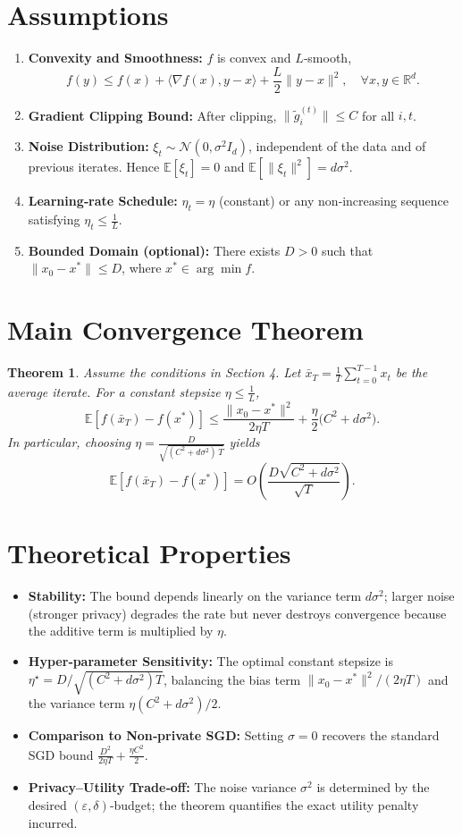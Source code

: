 \documentclass{article}
\newtheorem{theorem}{Theorem}
\newcommand{\EE}{\mathbb{E}}
\newcommand{\RR}{\mathbb{R}}
\begin{document}
\newpage
\section*{Assumptions}
\begin{enumerate}
\item \textbf{Convexity and Smoothness:} $f$ is convex and $L$‑smooth,
\[
f(y)\le f(x)+\langle\nabla f(x),y-x\rangle+\frac{L}{2}\|y-x\|^{2},
\quad\forall x,y\in\RR^{d}.
\]
\item \textbf{Gradient Clipping Bound:} After clipping, $\|\tilde g_i^{(t)}\|\le C$
for all $i,t$.
\item \textbf{Noise Distribution:} $\xi_t\sim\mathcal N(0,\sigma^{2}I_d)$, independent
of the data and of previous iterates. Hence $\EE[\xi_t]=0$ and
$\EE[\|\xi_t\|^{2}]=d\sigma^{2}$.
\item \textbf{Learning‑rate Schedule:} $\eta_t=\eta$ (constant) or any
non‑increasing sequence satisfying $\eta_t\le \frac{1}{L}$.
\item \textbf{Bounded Domain (optional):} There exists $D>0$ such that
$\|x_0-x^{*}\|\le D$, where $x^{*}\in\arg\min f$.
\end{enumerate}

\section*{Main Convergence Theorem}
\begin{theorem}
\label{thm:conv}
Assume the conditions in Section 4. Let $\bar x_T=\frac{1}{T}\sum_{t=0}^{T-1}x_t$
be the average iterate. For a constant stepsize $\eta\le \frac{1}{L}$,
\[
\EE\!\left[f(\bar x_T)-f(x^{*})\right]
\le
\frac{\|x_0-x^{*}\|^{2}}{2\eta T}
+\frac{\eta}{2}\bigl(C^{2}+d\sigma^{2}\bigr).
\]
In particular, choosing $\eta=\frac{D}{\sqrt{(C^{2}+d\sigma^{2})\,T}}$ yields
\[
\EE\!\left[f(\bar x_T)-f(x^{*})\right]
=O\!\left(\frac{D\sqrt{C^{2}+d\sigma^{2}}}{\sqrt{T}}\right).
\]
\end{theorem}

\section*{Theoretical Properties}
\begin{itemize}
\item \textbf{Stability:} The bound depends linearly on the variance term
$d\sigma^{2}$; larger noise (stronger privacy) degrades the rate but never
destroys convergence because the additive term is multiplied by $\eta$.
\item \textbf{Hyper‑parameter Sensitivity:} The optimal constant stepsize is
$\eta^{\star}=D/\sqrt{(C^{2}+d\sigma^{2})T}$, balancing the bias term
$\|x_0-x^{*}\|^{2}/(2\eta T)$ and the variance term $\eta(C^{2}+d\sigma^{2})/2$.
\item \textbf{Comparison to Non‑private SGD:} Setting $\sigma=0$ recovers the
standard SGD bound $\frac{D^{2}}{2\eta T}+\frac{\eta C^{2}}{2}$.
\item \textbf{Privacy–Utility Trade‑off:} The noise variance $\sigma^{2}$
is determined by the desired $(\varepsilon,\delta)$‑budget; the theorem
quantifies the exact utility penalty incurred.
\end{itemize}
\end{document}
